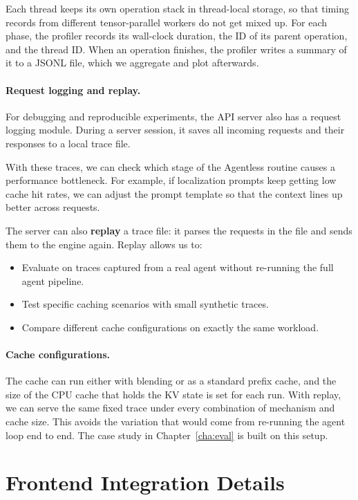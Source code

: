 Each thread keeps its own operation stack in thread-local storage, so that timing records from different tensor-parallel workers do not get mixed up. For each phase, the profiler records its wall-clock duration, the ID of its parent operation, and the thread ID. When an operation finishes, the profiler writes a summary of it to a JSONL file, which we aggregate and plot afterwards.

\paragraph{Request logging and replay.}
For debugging and reproducible experiments, the API server also has a request logging module. During a server session, it saves all incoming requests and their responses to a local trace file.

With these traces, we can check which stage of the Agentless routine causes a performance bottleneck. For example, if localization prompts keep getting low cache hit rates, we can adjust the prompt template so that the context lines up better across requests.

The server can also \textbf{replay} a trace file: it parses the requests in the file and sends them to the engine again. Replay allows us to:
\begin{itemize}
    \item Evaluate on traces captured from a real agent without re-running the full agent pipeline.
    \item Test specific caching scenarios with small synthetic traces.
    \item Compare different cache configurations on exactly the same workload.
\end{itemize}

\paragraph{Cache configurations.}
The cache can run either with blending or as a standard prefix cache, and the size of the CPU cache that holds the KV state is set for each run. With replay, we can serve the same fixed trace under every combination of mechanism and cache size. This avoids the variation that would come from re-running the agent loop end to end. The case study in Chapter~\ref{cha:eval} is built on this setup.

\section{Frontend Integration Details}
\label{sec:design_frontend_impl}

